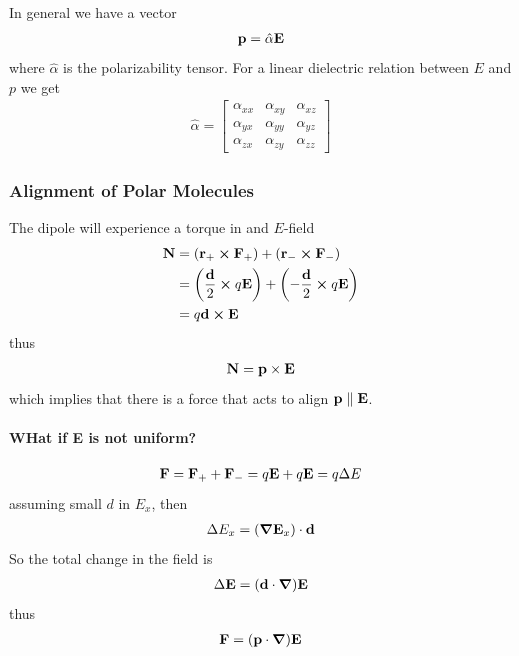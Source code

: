\documentclass[../main.tex]{subfiles}
\begin{document}
In general we have a vector
\begin{align*}
    \vb p = \hat \alpha \vb E
\end{align*}
where $\hat \alpha$ is the polarizability tensor. For a linear dielectric relation between $E$ and $p$ we get
\begin{align*}
    \hat \alpha = \begin{bmatrix}
        \alpha_{xx} & \alpha_{xy} & \alpha_{xz} \\
        \alpha_{yx} & \alpha_{yy} & \alpha_{yz} \\
        \alpha_{zx} & \alpha_{zy} & \alpha_{zz}
    \end{bmatrix}
\end{align*}

\subsubsection{Alignment of Polar Molecules}

The dipole will experience a torque in and $E$-field
\begin{align*}
    \vb N &= (\vb r_+ \cross \vb F_+) + (\vb r_- \cross \vb F_-) \\
    &= \qt(\frac{\vb d}{2} \cross q\vb E) + \qt(-\frac{\vb d}{2} \cross q\vb E) \\
    &= q \vb d \cross \vb E
\end{align*}
thus
\begin{align*}
    \vb N = \vb p \times \vb E
\end{align*}
which implies that there is a force that acts to align $\vb p \parallel \vb E$.

\paragraph{WHat if E is not uniform?}
\begin{align*}
    \vb F = \vb F_+ + \vb F_- = q \vb E + q \vb E = q \Delta E
\end{align*}
assuming small $d$ in $E_x$, then
\begin{align*}
    \Delta E_x = (\grad \vb E_x) \cdot \vb d
\end{align*}
So the total change in the field is
\begin{align*}
    \Delta \vb E = (\vb d \cdot \grad) \vb E
\end{align*}
thus
\begin{align*}
    \vb F = (\vb p \cdot \grad) \vb E
\end{align*}
\end{document}
